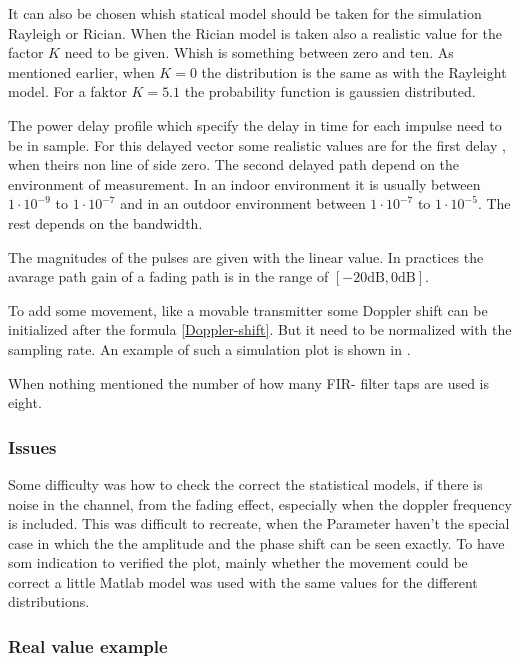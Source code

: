 It can also be chosen whish statical model should be taken for the simulation Rayleigh or Rician. When the Rician model is taken also a realistic value for the factor \(K\) need to be given. Whish is something between zero and ten. As mentioned earlier, when  \(K=0\) the distribution is the same as with the Rayleight model. For a faktor \(K = 5.1\) the probability function is gaussien distributed.

The power delay profile which specify the delay in time for each impulse need to be in sample. For this delayed vector some realistic values are for the first delay \cite{Mathworks}, when theirs non line of side zero. The second delayed path depend on the environment of measurement. In an indoor environment it is usually between \(1\cdot10^{-9}\) to \(1\cdot10^{-7}\) and in an outdoor environment between \(1\cdot10^{-7}\) to \(1\cdot10^{-5}\). The rest depends on  the bandwidth. 

The magnitudes of the pulses are given with the linear value. In practices the avarage path gain of a fading path is in the range of \([ -20 \text{dB} , 0\text{dB}]\).

To add some movement, like a movable transmitter some Doppler shift can be initialized after the formula \eqref{Doppler-shift}. But it need to be normalized with the sampling rate. 
An example of such a simulation plot is shown in .

When nothing mentioned the number of how many FIR- filter taps are used is eight.

\subsubsection{Issues}
Some difficulty was how to check the correct the statistical models, if there is noise in the channel, from the fading effect, especially when the doppler frequency is included. This was difficult to recreate, when the Parameter haven't the special case in which the the amplitude and the phase shift can be seen exactly. 
To have som indication to verified the plot, mainly whether the movement could be correct a little Matlab model was used with the same values for the different distributions.

\subsubsection{Real value example}

